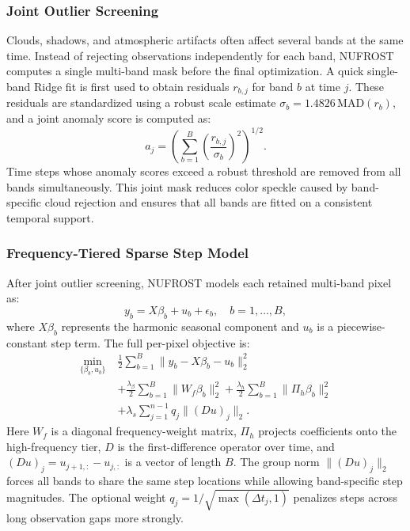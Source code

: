 \documentclass[letterpaper,journal]{IEEEtran}
\begin{document}
\subsubsection{Joint Outlier Screening}
Clouds, shadows, and atmospheric artifacts often affect several bands at the same time. Instead of rejecting observations independently for each band, NUFROST computes a single multi-band mask before the final optimization. A quick single-band Ridge fit is first used to obtain residuals $r_{b,j}$ for band $b$ at time $j$. These residuals are standardized using a robust scale estimate $\sigma_b = 1.4826\,\mathrm{MAD}(r_b)$, and a joint anomaly score is computed as:
\begin{equation}
\label{eq:joint_outlier}
a_j = \left(\sum_{b=1}^{B} \left(\frac{r_{b,j}}{\sigma_b}\right)^2\right)^{1/2}.
\end{equation}
Time steps whose anomaly scores exceed a robust threshold are removed from all bands simultaneously. This joint mask reduces color speckle caused by band-specific cloud rejection and ensures that all bands are fitted on a consistent temporal support.

\subsubsection{Frequency-Tiered Sparse Step Model}
After joint outlier screening, NUFROST models each retained multi-band pixel as:
\begin{equation}
\label{eq:model}
y_b = X\beta_b + u_b + \epsilon_b, \quad b = 1,\dots,B,
\end{equation}
where $X\beta_b$ represents the harmonic seasonal component and $u_b$ is a piecewise-constant step term. The full per-pixel objective is:
\begin{equation}
\begin{split}
\label{eq:objective}
\min_{\{\beta_b,u_b\}} \;& \frac{1}{2}\sum_{b=1}^{B}\|y_b-X\beta_b-u_b\|_2^2 \\
&+\frac{\lambda_{\beta}}{2}\sum_{b=1}^{B}\|W_f\beta_b\|_2^2
 +\frac{\lambda_{h}}{2}\sum_{b=1}^{B}\|\Pi_h\beta_b\|_2^2 \\
&+\lambda_s\sum_{j=1}^{n-1} q_j\|(Du)_j\|_2 .
\end{split}
\end{equation}
Here $W_f$ is a diagonal frequency-weight matrix, $\Pi_h$ projects coefficients onto the high-frequency tier, $D$ is the first-difference operator over time, and $(Du)_j = u_{j+1,:}-u_{j,:}$ is a vector of length $B$. The group norm $\|(Du)_j\|_2$ forces all bands to share the same step locations while allowing band-specific step magnitudes. The optional weight $q_j = 1/\sqrt{\max(\Delta t_j,1)}$ penalizes steps across long observation gaps more strongly.
\end{document}
